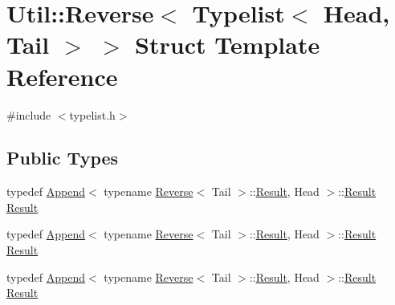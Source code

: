 \hypertarget{structUtil_1_1TL_1_1Reverse_3_01Typelist_3_01Head_00_01Tail_01_4_01_4}{}\section{Util\+:\+:Reverse$<$ Typelist$<$ Head, Tail $>$ $>$ Struct Template Reference}
\label{structUtil_1_1TL_1_1Reverse_3_01Typelist_3_01Head_00_01Tail_01_4_01_4}


{\ttfamily \#include $<$typelist.\+h$>$}

\subsection*{Public Types}
\begin{DoxyCompactItemize}
\item 
typedef \mbox{\hyperlink{structUtil_1_1TL_1_1Append}{Append}}$<$ typename \mbox{\hyperlink{structUtil_1_1TL_1_1Reverse}{Reverse}}$<$ Tail $>$\+::\mbox{\hyperlink{structUtil_1_1TL_1_1Reverse_3_01Typelist_3_01Head_00_01Tail_01_4_01_4_a9886893d82dd4c1124f42d7d45fdbdbd}{Result}}, Head $>$\+::\mbox{\hyperlink{structUtil_1_1TL_1_1Reverse_3_01Typelist_3_01Head_00_01Tail_01_4_01_4_a9886893d82dd4c1124f42d7d45fdbdbd}{Result}} \mbox{\hyperlink{structUtil_1_1TL_1_1Reverse_3_01Typelist_3_01Head_00_01Tail_01_4_01_4_a9886893d82dd4c1124f42d7d45fdbdbd}{Result}}
\item 
typedef \mbox{\hyperlink{structUtil_1_1TL_1_1Append}{Append}}$<$ typename \mbox{\hyperlink{structUtil_1_1TL_1_1Reverse}{Reverse}}$<$ Tail $>$\+::\mbox{\hyperlink{structUtil_1_1TL_1_1Reverse_3_01Typelist_3_01Head_00_01Tail_01_4_01_4_a9886893d82dd4c1124f42d7d45fdbdbd}{Result}}, Head $>$\+::\mbox{\hyperlink{structUtil_1_1TL_1_1Reverse_3_01Typelist_3_01Head_00_01Tail_01_4_01_4_a9886893d82dd4c1124f42d7d45fdbdbd}{Result}} \mbox{\hyperlink{structUtil_1_1TL_1_1Reverse_3_01Typelist_3_01Head_00_01Tail_01_4_01_4_a9886893d82dd4c1124f42d7d45fdbdbd}{Result}}
\item 
typedef \mbox{\hyperlink{structUtil_1_1TL_1_1Append}{Append}}$<$ typename \mbox{\hyperlink{structUtil_1_1TL_1_1Reverse}{Reverse}}$<$ Tail $>$\+::\mbox{\hyperlink{structUtil_1_1TL_1_1Reverse_3_01Typelist_3_01Head_00_01Tail_01_4_01_4_a9886893d82dd4c1124f42d7d45fdbdbd}{Result}}, Head $>$\+::\mbox{\hyperlink{structUtil_1_1TL_1_1Reverse_3_01Typelist_3_01Head_00_01Tail_01_4_01_4_a9886893d82dd4c1124f42d7d45fdbdbd}{Result}} \mbox{\hyperlink{structUtil_1_1TL_1_1Reverse_3_01Typelist_3_01Head_00_01Tail_01_4_01_4_a9886893d82dd4c1124f42d7d45fdbdbd}{Result}}
\end{DoxyCompactItemize}


